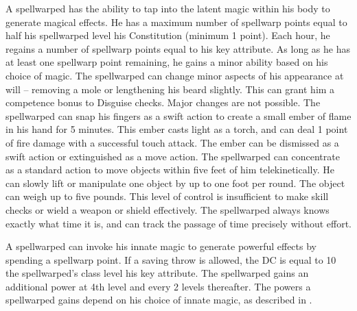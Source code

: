  A spellwarped has the ability to tap into the latent magic within his body to generate magical effects. He has a maximum number of spellwarp points equal to half his spellwarped level \add his Constitution (minimum 1 point). Each hour, he regains a number of spellwarp points equal to his key attribute. As long as he has at least one spellwarp point remaining, he gains a minor ability based on his choice of magic.
 The spellwarped can change minor aspects of his appearance at will -- removing a mole or lengthening his beard slightly. This can grant him a  competence bonus to Disguise checks. Major changes are not possible.
 The spellwarped can snap his fingers as a swift action to create a small ember of flame in his hand for 5 minutes. This ember casts light as a torch, and can deal 1 point of fire damage with a successful touch attack. The ember can be dismissed as a swift action or extinguished as a move action.
 The spellwarped can concentrate as a standard action to move objects within five feet of him telekinetically. He can slowly lift or manipulate one object by up to one foot per round. The object can weigh up to five pounds. This level of control is insufficient to make skill checks or wield a weapon or shield effectively.
 The spellwarped always knows exactly what time it is, and can track the passage of time precisely without effort.

 A spellwarped can invoke his innate magic to generate powerful effects by spending a spellwarp point. If a saving throw is allowed, the DC is equal to 10 \add the spellwarped's class level \add his key attribute. The spellwarped gains an additional power at 4th level and every 2 levels thereafter. The powers a spellwarped gains depend on his choice of innate magic, as described in .

